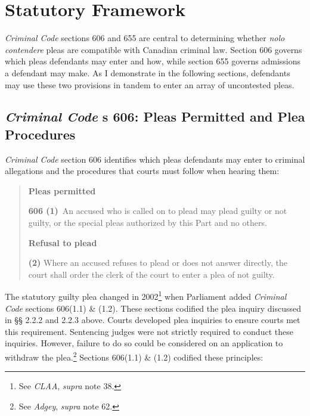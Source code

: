 \section{Statutory Framework}

\textit{Criminal Code} sections 606 and 655 are central to determining whether \textit{nolo contendere} pleas are compatible with Canadian criminal law. Section 606 governs which pleas defendants may enter and how, while section 655 governs admissions a defendant may make. As I demonstrate in the following sections, defendants may use these two provisions in tandem to enter an array of uncontested pleas.

\subsection{\textit{Criminal Code} s 606: Pleas Permitted and Plea Procedures}

\textit{Criminal Code} section 606 identifies which pleas defendants may enter to criminal allegations and the procedures that courts must follow when hearing them:

\begin{quote}
    \onehalfspacing
    \textbf{Pleas permitted}
    
    \textbf{606 (1)} An accused who is called on to plead may plead guilty or not guilty, or the special pleas authorized by this Part and no others.\medskip

    \textbf{Refusal to plead}
    
    \textbf{(2)} Where an accused refuses to plead or does not answer directly, the court shall order the clerk of the court to enter a plea of not guilty.
    
\end{quote}
The statutory guilty plea changed in 2002\footnote{See \textit{CLAA}, \textit{supra} note 38.} when Parliament added \textit{Criminal Code} sections 606(1.1) \& (1.2). These sections codified the plea inquiry discussed in §§ 2.2.2 and 2.2.3 above. Courts developed plea inquiries to ensure courts met this requirement. Sentencing judges were not strictly required to conduct these inquiries. However, failure to do so could be considered on an application to withdraw the plea.\footnote{See \textit{Adgey}, \textit{supra} note 62.} Sections 606(1.1) \& (1.2) codified these principles:

